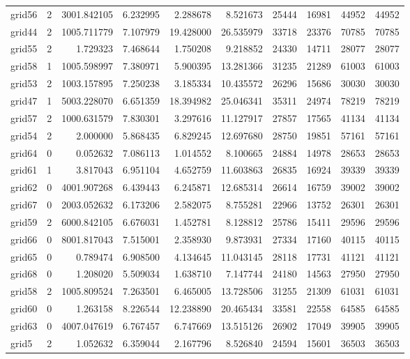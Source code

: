 \begin{longtable}{|l|r|r|r|r|r|r|r|r|r|}
grid56 & 2 & 3001.842105 & 6.232995 & 2.288678 & 8.521673 & 25444 & 16981 & 44952 & 44952 \\
grid44 & 2 & 1005.711779 & 7.107979 & 19.428000 & 26.535979 & 33718 & 23376 & 70785 & 70785 \\
grid55 & 2 & 1.729323 & 7.468644 & 1.750208 & 9.218852 & 24330 & 14711 & 28077 & 28077 \\
grid58 & 1 & 1005.598997 & 7.380971 & 5.900395 & 13.281366 & 31235 & 21289 & 61003 & 61003 \\
grid53 & 2 & 1003.157895 & 7.250238 & 3.185334 & 10.435572 & 26296 & 15686 & 30030 & 30030 \\
grid47 & 1 & 5003.228070 & 6.651359 & 18.394982 & 25.046341 & 35311 & 24974 & 78219 & 78219 \\
grid57 & 2 & 1000.631579 & 7.830301 & 3.297616 & 11.127917 & 27857 & 17565 & 41134 & 41134 \\
grid54 & 2 & 2.000000 & 5.868435 & 6.829245 & 12.697680 & 28750 & 19851 & 57161 & 57161 \\
grid64 & 0 & 0.052632 & 7.086113 & 1.014552 & 8.100665 & 24884 & 14978 & 28653 & 28653 \\
grid61 & 1 & 3.817043 & 6.951104 & 4.652759 & 11.603863 & 26835 & 16924 & 39339 & 39339 \\
grid62 & 0 & 4001.907268 & 6.439443 & 6.245871 & 12.685314 & 26614 & 16759 & 39002 & 39002 \\
grid67 & 0 & 2003.052632 & 6.173206 & 2.582075 & 8.755281 & 22966 & 13752 & 26301 & 26301 \\
grid59 & 2 & 6000.842105 & 6.676031 & 1.452781 & 8.128812 & 25786 & 15411 & 29596 & 29596 \\
grid66 & 0 & 8001.817043 & 7.515001 & 2.358930 & 9.873931 & 27334 & 17160 & 40115 & 40115 \\
grid65 & 0 & 0.789474 & 6.908500 & 4.134645 & 11.043145 & 28118 & 17731 & 41121 & 41121 \\
grid68 & 0 & 1.208020 & 5.509034 & 1.638710 & 7.147744 & 24180 & 14563 & 27950 & 27950 \\
grid58 & 2 & 1005.809524 & 7.263501 & 6.465005 & 13.728506 & 31255 & 21309 & 61031 & 61031 \\
grid60 & 0 & 1.263158 & 8.226544 & 12.238890 & 20.465434 & 33581 & 22558 & 64585 & 64585 \\
grid63 & 0 & 4007.047619 & 6.767457 & 6.747669 & 13.515126 & 26902 & 17049 & 39905 & 39905 \\
grid5 & 2 & 1.052632 & 6.359044 & 2.167796 & 8.526840 & 24594 & 15601 & 36503 & 36503 \\

\end{longtable}
